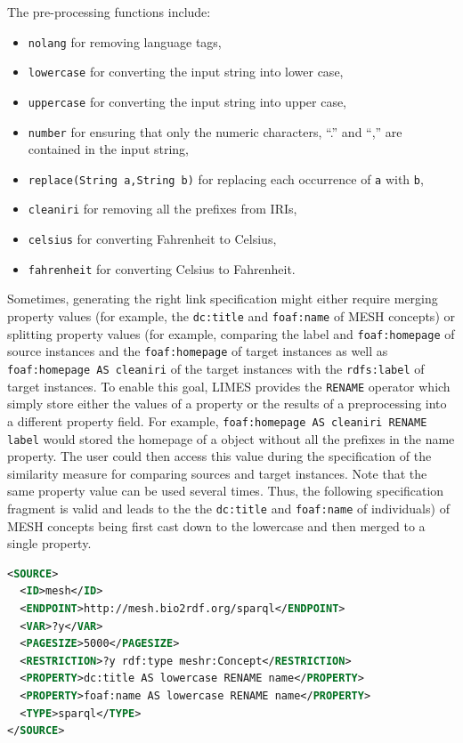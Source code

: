 \documentclass[a4paper, 11pt]{article}
\begin{document}
 The pre-processing functions include:
\begin{itemize}
\item \texttt{nolang} for removing language tags,
\item \texttt{lowercase} for converting the input string into lower case,
\item \texttt{uppercase} for converting the input string into upper case,
\item \texttt{number} for ensuring that only the numeric characters, ``.'' and ``,'' are contained in the input string,
\item \texttt{replace(String a,String b)} for replacing each occurrence of \texttt{a} with \texttt{b},
\item \texttt{cleaniri} for removing all the prefixes from IRIs,
\item \texttt{celsius} for converting Fahrenheit to Celsius,
\item \texttt{fahrenheit} for converting Celsius to Fahrenheit.
\end{itemize}

Sometimes, generating the right link specification might either require merging property values (for example, the \texttt{dc:title} and \texttt{foaf:name} of MESH concepts) or splitting property values (for example, comparing the label and \texttt{foaf:homepage} of source instances and the \texttt{foaf:homepage} of target instances as well as \texttt{foaf:homepage AS cleaniri} of the target instances with the \texttt{rdfs:label} of target instances. To enable this goal, LIMES provides the \texttt{RENAME} operator which simply store either the values of a property or the results of a preprocessing into a different property field. For example, \texttt{foaf:homepage AS cleaniri RENAME label} would stored the homepage of a object without all the prefixes in the name property. The user could then access this value during the specification of the similarity measure for comparing sources and target instances. Note that the same property value can be used several times. Thus, the following specification fragment is valid and leads to the the \texttt{dc:title} and \texttt{foaf:name} of individuals)  of MESH concepts being first cast down to the lowercase and then merged to a single property.

\begin{ttfamily}
\begin{lstlisting}[language=XML,basicstyle=\scriptsize,numberstyle=\tiny]
<SOURCE>
  <ID>mesh</ID>
  <ENDPOINT>http://mesh.bio2rdf.org/sparql</ENDPOINT>
  <VAR>?y</VAR>
  <PAGESIZE>5000</PAGESIZE>
  <RESTRICTION>?y rdf:type meshr:Concept</RESTRICTION>
  <PROPERTY>dc:title AS lowercase RENAME name</PROPERTY>
  <PROPERTY>foaf:name AS lowercase RENAME name</PROPERTY>
  <TYPE>sparql</TYPE>
</SOURCE>
\end{lstlisting}
\end{ttfamily}
\end{document}
